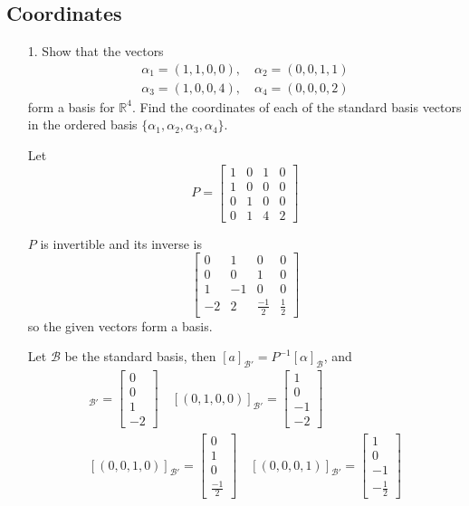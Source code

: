 \documentclass{article}
\begin{document}
\subsection{Coordinates}
\begin{enumerate}[listparindent=\parindent]

\item[1.] Show that the vectors
    \begin{gather*}
        \alpha_1 = (1, 1, 0, 0),\quad \alpha_2 = (0, 0, 1, 1) \\
        \alpha_3 = (1, 0, 0, 4),\quad \alpha_4 = (0, 0, 0, 2)
    \end{gather*}
    form a basis for \(\mathbb{R}^4\). Find the coordinates of each of the standard basis vectors in the ordered basis \(\{\alpha_1, \alpha_2, \alpha_3, \alpha_4\}\).

    Let \[P = \begin{bmatrix}
        1 & 0 & 1 & 0 \\
        1 & 0 & 0 & 0 \\
        0 & 1 & 0 & 0 \\
        0 & 1 & 4 & 2
    \end{bmatrix}\]

    \(P\) is invertible and its inverse is
    \[\begin{bmatrix}
        0 & 1 & 0 & 0 \\
        0 & 0 & 1 & 0 \\
        1 & -1 & 0 & 0 \\
        -2 & 2 & \frac{-1}{2} & \frac{1}{2}
    \end{bmatrix}\]
    so the given vectors form a basis.

    Let \(\mathcal{B}\) be the standard basis, then \([a]_\mathcal{B'} = P^{-1}[\alpha]_\mathcal{B}\), and
    \begin{gather*}
        [(1, 0, 0, 0)]_\mathcal{B'} = \begin{bmatrix} 0 \\ 0 \\ 1 \\ -2 \end{bmatrix} \quad
        [(0, 1, 0, 0)]_\mathcal{B'} = \begin{bmatrix} 1 \\ 0 \\ -1 \\ -2 \end{bmatrix} \\
        [(0, 0, 1, 0)]_\mathcal{B'} = \begin{bmatrix} 0 \\ 1 \\ 0 \\ \frac{-1}{2} \end{bmatrix} \quad
        [(0, 0, 0, 1)]_\mathcal{B'} = \begin{bmatrix} 1 \\ 0 \\ -1 \\ -\frac{1}{2} \end{bmatrix}
    \end{gather*}


\end{enumerate}
\end{document}
